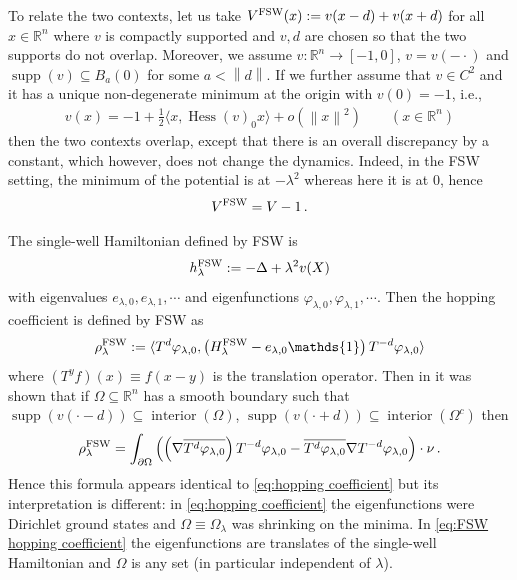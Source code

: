 \documentclass[a4paper,10pt]{article}
\numberwithin{equation}{section}
\theoremstyle{plain}
\theoremstyle{plain}
\theoremstyle{plain}
\theoremstyle{plain}
\theoremstyle{plain}
\theoremstyle{remark}
\theoremstyle{definition}
\newcommand{\RR}{\mathbb{R}}
\newcommand\norm[1]{\left\lVert#1\right\rVert}
\newcommand{\ip}[2]{\langle #1, #2 \rangle}
\newcommand{\vf}{\varphi}
\newcommand{\Id}{\mathds{1}}
\newcommand{\supp}{\operatorname{supp}}
\newcommand{\eq}[1]{\begin{align*}#1\end{align*}}
\newcommand{\eql}[1]{\begin{align}#1\end{align}}
\newcommand{\br}[1]{\left(#1\right)}
\begin{document}
To relate the two contexts, let us take
$V^{\rm FSW}(x) := v(x-d)+v(x+d)$ for all $x\in\RR^n$ where $v$ is compactly supported and $v,d$ are chosen so that the two supports do not overlap. Moreover, we assume $v:\RR^n\to[-1,0]$, $v=v\br{-\cdot}$ and $\supp(v)\subseteq B_a(0)$ for some $a<\norm{d}$. If we further assume that $v\in C^2$ and it has a unique non-degenerate minimum at the origin with $v(0)=-1$, i.e.,\eq{
v(x) = -1 + \frac12 \ip{x}{\operatorname{Hess}\br{v}_0 x} + o(\norm{x}^2)\qquad(x\in\RR^n)
} then the two contexts overlap, except that there is an overall discrepancy by a constant, which however, does not change the dynamics. Indeed, in the FSW setting, the minimum of the potential is at $-\lambda^2$ whereas here it is at $0$, hence \eq{
V^{\rm FSW} = V-1\,.
}

The single-well Hamiltonian defined by FSW is \eq{
h_\lambda^{\rm FSW} := -\Delta + \lambda^2 v(X)
} with eigenvalues $e_{\lambda,0},e_{\lambda,1},\cdots$ and eigenfunctions $\vf_{\lambda,0},\vf_{\lambda,1},\cdots$. Then the hopping coefficient is defined by FSW as 
\eq{
\rho_\lambda^{\rm FSW} := \ip{T^d \vf_{\lambda,0}}{\br{H_\lambda^{\rm FSW}-e_{\lambda,0}\Id}T^{-d}\vf_{\lambda,0}}
} where $\br{T^y f}(x)\equiv f(x-y)$ is the translation operator. Then in \cite{Fefferman2025} it was shown that if $\Omega\subseteq\RR^n$ has a smooth boundary such that $\supp(v(\cdot-d))\subseteq\operatorname{interior}\br{\Omega}$, $\supp(v(\cdot+d))\subseteq\operatorname{interior}\br{\Omega^c}$ then
\eql{\label{eq:FSW hopping coefficient}
\rho_\lambda^{\rm FSW} = \int_{\partial\Omega}
\left(
\br{\nabla\overline{T^d\vf_{\lambda,0}}}
T^{-d}\vf_{\lambda,0}
-
\overline{T^d\vf_{\lambda,0}}
\nabla T^{-d}\vf_{\lambda,0}
\right)\cdot\nu\,.
} Hence this formula appears identical to \cref{eq:hopping coefficient} but its interpretation is different: in \cref{eq:hopping coefficient} the eigenfunctions were Dirichlet ground states and $\Omega\equiv\Omega_\lambda$ was shrinking on the minima. In \cref{eq:FSW hopping coefficient} the eigenfunctions are translates of the single-well Hamiltonian and $\Omega$ is any set (in particular independent of $\lambda$). 
\end{document}
